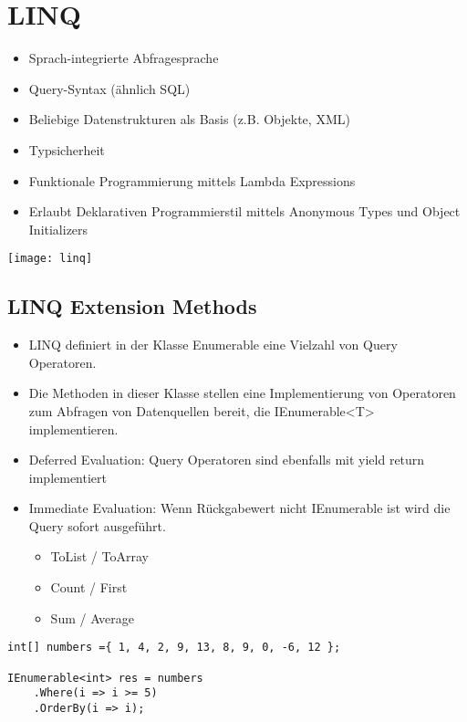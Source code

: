 \section{LINQ}

\begin{multicols*}{2}
\begin{itemize}
    \item Sprach-integrierte Abfragesprache
    \item Query-Syntax (ähnlich SQL)
    \item Beliebige Datenstrukturen als Basis (z.B. Objekte, XML)
    \item Typsicherheit
    \item Funktionale Programmierung mittels Lambda Expressions
    \item Erlaubt Deklarativen Programmierstil mittels Anonymous Types und Object Initializers
\end{itemize}
\vspace*{2mm}
\texttt{[image: linq]}

\subsection{LINQ Extension Methods}
\begin{itemize}
    \item LINQ definiert in der Klasse Enumerable eine Vielzahl von Query Operatoren.
    \item Die Methoden in dieser Klasse stellen eine Implementierung von Operatoren zum Abfragen von Datenquellen bereit, die IEnumerable<T> implementieren.
    \item Deferred Evaluation: Query Operatoren sind ebenfalls mit yield return implementiert
    \item Immediate Evaluation: Wenn Rückgabewert nicht IEnumerable ist wird die Query sofort ausgeführt.
    \begin{itemize}
        \item ToList / ToArray
        \item Count / First
        \item Sum / Average
    \end{itemize}
\end{itemize}


\begin{lstlisting}
int[] numbers ={ 1, 4, 2, 9, 13, 8, 9, 0, -6, 12 };

IEnumerable<int> res = numbers 
    .Where(i => i >= 5) 
    .OrderBy(i => i);


\end{lstlisting}
\end{multicols*}
